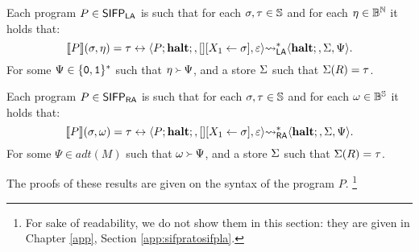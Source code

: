 \begin{characterization}
  \label{char:bigsmallstepla}
  Each program $P \in\mathsf{SIFP_{{\mathsf{LA}}}}$ is such that for each $\sigma,\tau \in \mathbb{S}$ and for each
  $\eta \in \mathbb{B}^{\mathbb{N}}$ it holds that:
  $$
\llbracket P \rrbracket(\sigma, \eta) = \tau \leftrightarrow \langle P;\mathbf{halt};, [] [X_1 \leftarrow \sigma], \varepsilon\rangle {\leadsto_{\mathsf{LA}}^{*}}  \langle \mathbf{halt};, \Sigma, \Psi\rangle.
  $$
  For some $\Psi \in  \{\mathtt{0}, \mathtt{1}\}^*$ such that $\eta \Yright \Psi$, and a store $\Sigma$ such that
  $\Sigma(R)=\tau$.
\end{characterization}

\begin{characterization}
  \label{char:bigsmallstepra}
  Each program $P \in\mathsf{SIFP_{{\mathsf{RA}}}}$ is such that for each $\sigma,\tau \in \mathbb{S}$ and for each
  $\omega \in \mathbb{B}^{\mathbb{S}}$ it holds that:
  $$
\llbracket P \rrbracket(\sigma, \omega) = \tau \leftrightarrow \langle P;\mathbf{halt};, [] [X_1 \leftarrow \sigma], \varepsilon\rangle {\leadsto_{\mathsf{RA}}^{*}}  \langle \mathbf{halt};, \Sigma, \Psi\rangle.
  $$
  For some $\Psi \in  \mathit{adt}(M)$ such that $\omega \Yright \Psi$, and a store $\Sigma$ such that
  $\Sigma(R)=\tau$.
\end{characterization}

The proofs of these results are given on the syntax of the program $P$.
\footnote{For sake of readability, we do not show them in this section:
they are given in Chapter \ref{app}, Section \ref{app:sifpratosifpla}.}


